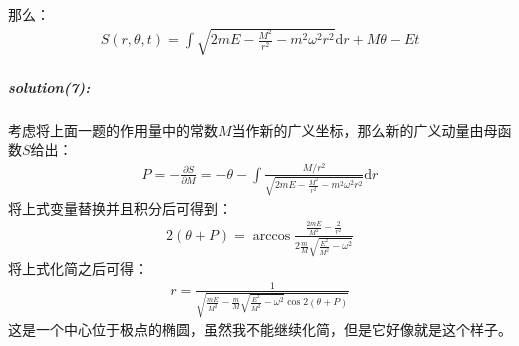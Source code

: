 \documentclass[a4paper]{ctexart}
\def\d{\mathrm{d}}
\begin{document}
    那么：
    \begin{align}
        S(r, \theta, t) = \int\sqrt{2mE - \frac{M^{2}}{r^{2}} - m^{2}\omega^{2}r^{2}}\d r + M\theta - Et
    \end{align}
    \subparagraph{solution(7):}
    考虑将上面一题的作用量中的常数$M$当作新的广义坐标，那么新的广义动量由母函数$S$给出：
    \begin{align}
        P = -\frac{\partial S}{\partial M} = -\theta - \int\frac{M/r^{2}}{\sqrt{2mE - \frac{M^{2}}{r^{2}} - m^{2}\omega^{2}r^{2}}} \d r
    \end{align}
    将上式变量替换并且积分后可得到：
    \begin{align}
        2(\theta + P) = \arccos\frac{\frac{2mE}{M^{2}} - \frac{2}{r^{2}}}{2\frac{m}{M}\sqrt{\frac{E^{2}}{M^{2}} - \omega^{2}}}
    \end{align}
    将上式化简之后可得：
    \begin{align}
        r = \frac{1}{\sqrt{\frac{mE}{M^{2}}-\frac{m}{M}\sqrt{\frac{E^{2}}{M^{2}} - \omega^{2}}\cos2(\theta + P)}}
    \end{align}
    这是一个中心位于极点的椭圆，虽然我不能继续化简，但是它好像就是这个样子。
\end{document}
